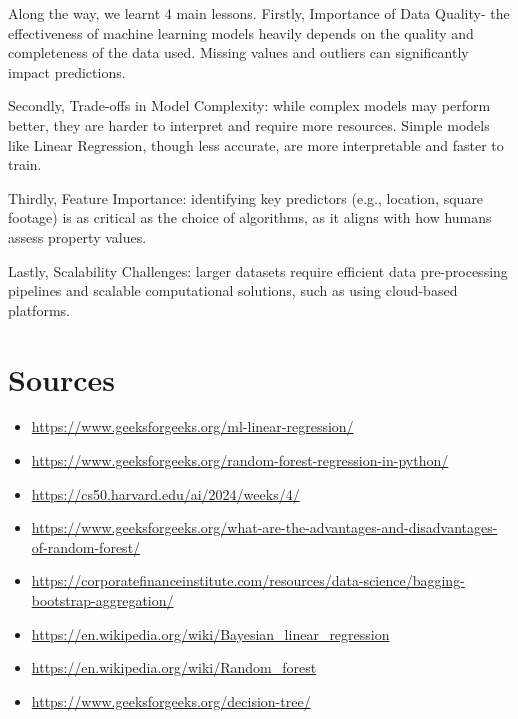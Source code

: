\documentclass{article}
\begin{document}
Along the way, we learnt 4 main lessons. Firstly, Importance of Data Quality- the effectiveness of machine learning models heavily depends on the quality and completeness of the data used. Missing values and outliers can significantly impact predictions. 

Secondly, Trade-offs in Model Complexity: while complex models may perform better, they are harder to interpret and require more resources. Simple models like Linear Regression, though less accurate, are more interpretable and faster to train. 

Thirdly, Feature Importance: identifying key predictors (e.g., location, square footage) is as critical as the choice of algorithms, as it aligns with how humans assess property values. 

Lastly, Scalability Challenges: larger datasets require efficient data pre-processing pipelines and scalable computational solutions, such as using cloud-based platforms.

\section{Sources}
\begin{itemize}
    \item \href{https://www.geeksforgeeks.org/ml-linear-regression/}{https://www.geeksforgeeks.org/ml-linear-regression/}
    \item \href{https://www.geeksforgeeks.org/random-forest-regression-in-python/}{https://www.geeksforgeeks.org/random-forest-regression-in-python/}
    \item \href{https://cs50.harvard.edu/ai/2024/weeks/4/}{https://cs50.harvard.edu/ai/2024/weeks/4/}
    \item \href{https://www.geeksforgeeks.org/what-are-the-advantages-and-disadvantages-of-random-forest/}{https://www.geeksforgeeks.org/what-are-the-advantages-and-disadvantages-of-random-forest/}
    \item \href{https://corporatefinanceinstitute.com/resources/data-science/bagging-bootstrap-aggregation/}{https://corporatefinanceinstitute.com/resources/data-science/bagging-bootstrap-aggregation/}
    \item \href{https://en.wikipedia.org/wiki/Bayesian_linear_regression}{https://en.wikipedia.org/wiki/Bayesian\_linear\_regression}
    \item \href{https://en.wikipedia.org/wiki/Random_forest}{https://en.wikipedia.org/wiki/Random\_forest}
    \item \href{https://www.geeksforgeeks.org/decision-tree/}{https://www.geeksforgeeks.org/decision-tree/}
\end{itemize}
\end{document}
